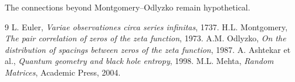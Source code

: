 \documentclass[11pt,a4paper]{article}
\begin{document}
The connections beyond Montgomery--Odlyzko remain hypothetical.

\begin{thebibliography}{9}
 L. Euler, \textit{Variae observationes circa series infinitas}, 1737.
 H.L. Montgomery, \textit{The pair correlation of zeros of the zeta function}, 1973.
 A.M. Odlyzko, \textit{On the distribution of spacings between zeros of the zeta function}, 1987.
 A. Ashtekar et al., \textit{Quantum geometry and black hole entropy}, 1998.
 M.L. Mehta, \textit{Random Matrices}, Academic Press, 2004.
\end{thebibliography}
\end{document}
